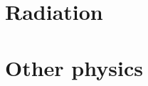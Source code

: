 \documentclass[onecolumn,iop]{emulateapj}  %
\begin{document}
\section{Radiation}
\label{sec.allrad}
 
 
 

\section{Other physics}
\label{sec.otherphys}
 










 

  



  


\end{document}
